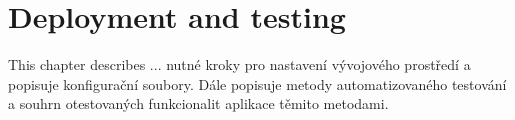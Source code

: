 \chapter{Deployment and testing}\label{ch:mobile-application-implementation}

This chapter describes ... nutné kroky pro nastavení vývojového prostředí a popisuje konfigurační soubory.
Dále popisuje metody automatizovaného testování a souhrn otestovaných funkcionalit aplikace těmito metodami.






